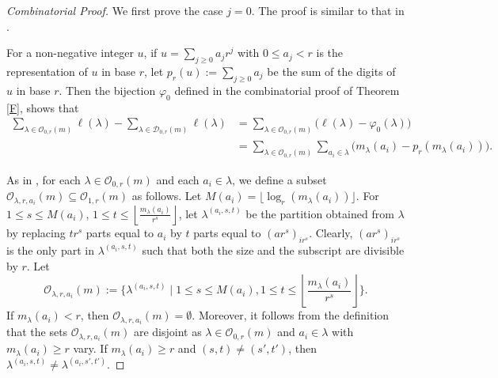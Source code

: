 \documentclass[reqno,12pt]{amsart}
\theoremstyle{definition}
\begin{document}
\begin{proof}[Combinatorial Proof] We first prove the case $j=0$. The proof is similar to that in \cite[Section 3]{Yang19}. 

For a non-negative integer $u$, if $u=\sum_{j\geq 0}a_j r^j$ with $0\leq a_j<r$ is the representation of $u$ in base $r$, let $p_r(u):=\sum_{j\geq 0}a_j$ be the sum of the digits of $u$ in base $r$. Then the bijection $\varphi_0$ defined in the combinatorial proof of Theorem \ref{F}, shows that 
\begin{align*} \sum_{\lambda\in\mathcal{O}_{0,r}(m)}\ell(\lambda)-\sum_{\lambda\in\mathcal{D}_{0,r}(m)}\ell(\lambda)& =\sum_{\lambda\in\mathcal{O}_{0,r}(m)}\Big(\ell(\lambda)-\varphi_0(\lambda)\Big)\\ & =\sum_{\lambda\in\mathcal{O}_{0,r}(m)}\sum_{a_i\in \lambda}\Big(m_\lambda(a_i)-p_r(m_\lambda(a_i))\Big). 
\end{align*} 


As in \cite{Yang19}, for each $\lambda\in \mathcal O_{0,r}(m)$ and each $a_i\in \lambda$, we define a  subset $\mathcal O_{\lambda,r,a_i}(m)\subseteq \mathcal O_{1,r}(m)$ as follows. Let $M(a_i)=\lfloor \log_r(m_\lambda(a_i))\rfloor$. For $1\leq s\leq M(a_i)$, $1\leq t\leq \left\lfloor \frac{m_\lambda(a_i)}{r^s}\right\rfloor$, let $\lambda^{(a_i, s, t)}$ be the partition obtained from $\lambda$ by replacing $tr^s$ parts equal to $a_i$ by $t$ parts equal to $(ar^s)_{ir^s}$.  Clearly, $(ar^s)_{ir^s}$ is  the only part in $\lambda^{(a_i, s, t)}$ such that both the size and the subscript are divisible by $r$. Let 
$$\mathcal O_{\lambda,r, a_i}(m):=\Big\{\lambda^{(a_i, s, t)} \mid 1\leq s\leq M(a_i), 1\leq t\leq \left\lfloor \frac{m_\lambda(a_i)}{r^s}\right\rfloor\Big\}.$$ 
If $m_\lambda(a_i)<r$, then $\mathcal O_{\lambda,r,a_i}(m)=\emptyset$. 
Moreover, it follows from the definition that the sets $\mathcal O_{\lambda,r, a_i}(m)$ are disjoint as $\lambda\in \mathcal O_{0,r}(m)$ and $a_i\in \lambda$ with $m_\lambda(a_i)\geq r$ vary.
If $m_\lambda(a_i)\geq r$ and $(s,t)\neq (s',t')$, then $\lambda^{(a_i, s, t)}\neq \lambda^{(a_i, s', t')}$. 


\end{proof}
\end{document}
